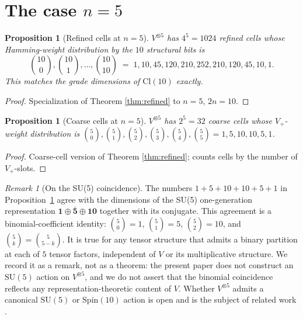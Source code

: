 \documentclass[11pt,reqno]{amsart}
\theoremstyle{plain}
\newtheorem{proposition}[theorem]{Proposition}
\theoremstyle{definition}
\theoremstyle{remark}
\newtheorem*{remark}{Remark}
\newcommand{\Cl}{\mathrm{Cl}}
\begin{document}
\section{The case $n = 5$}
\label{sec:n5}

\begin{proposition}[Refined cells at $n = 5$]\label{prop:n5refined}
$V^{\otimes 5}$ has $4^5 = 1024$ refined cells whose
Hamming-weight distribution by the $10$ structural bits is
\[
\binom{10}{0},\binom{10}{1},\ldots,\binom{10}{10}
\;=\;
1, 10, 45, 120, 210, 252, 210, 120, 45, 10, 1.
\]
This matches the grade dimensions of $\Cl(10)$ exactly.
\end{proposition}

\begin{proof}
Specialization of Theorem \ref{thm:refined} to $n = 5$, $2n = 10$.
\end{proof}

\begin{proposition}[Coarse cells at $n = 5$]\label{prop:n5coarse}
$V^{\otimes 5}$ has $2^5 = 32$ coarse cells whose
$V_+$-weight distribution is
$\binom{5}{0}, \binom{5}{1}, \binom{5}{2}, \binom{5}{3},
 \binom{5}{4}, \binom{5}{5}
 = 1, 5, 10, 10, 5, 1$.
\end{proposition}

\begin{proof}
Coarse-cell version of Theorem \ref{thm:refined}; counts cells by the
number of $V_+$-slots.
\end{proof}

\begin{remark}[On the SU(5) coincidence]\label{rem:su5}
The numbers $1 + 5 + 10 + 10 + 5 + 1$ in
Proposition~\ref{prop:n5coarse} agree with the dimensions of the
SU(5) one-generation representation
$\mathbf{1} \oplus \bar{\mathbf{5}} \oplus \mathbf{10}$ together with
its conjugate.  This agreement is a binomial-coefficient identity:
$\binom{5}{0} = 1$, $\binom{5}{1} = 5$, $\binom{5}{2} = 10$, and
$\binom{5}{k} = \binom{5}{5-k}$.  It is true for any tensor structure
that admits a binary partition at each of $5$ tensor factors,
independent of $V$ or its multiplicative structure.  We record it as a
remark, not as a theorem: the present paper does not construct an
$\mathrm{SU}(5)$ action on $V^{\otimes 5}$, and we do not assert that
the binomial coincidence reflects any representation-theoretic content
of $V$.  Whether $V^{\otimes 5}$ admits a canonical $\mathrm{SU}(5)$
or $\mathrm{Spin}(10)$ action is open and is the subject of related
work \cite{SandersGishDiscreteDirac}.
\end{remark}
\end{document}
